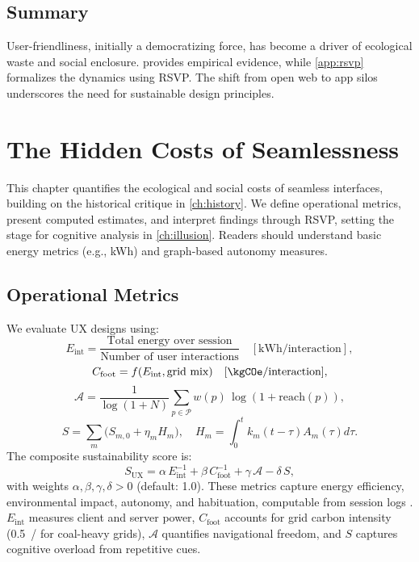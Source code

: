 \documentclass[openany]{book}
\newcommand{\Sent}{S} %
\newcommand{\Eint}{E_{\mathrm{int}}} %
\newcommand{\Cfoot}{C_{\mathrm{foot}}} %
\newcommand{\Auton}{\mathcal{A}} %
\newcommand{\SUX}{S_{\mathrm{UX}}} %
\newcommand{\kWh}{\mathrm{kWh}}
\begin{document}
\section{Summary}
User-friendliness, initially a democratizing force, has become a driver of ecological waste and social enclosure.  provides empirical evidence, while \cref{app:rsvp} formalizes the dynamics using RSVP. The shift from open web to app silos underscores the need for sustainable design principles.

\chapter{The Hidden Costs of Seamlessness}
\label{ch:hidden-costs}

This chapter quantifies the ecological and social costs of seamless interfaces, building on the historical critique in \cref{ch:history}. We define operational metrics, present computed estimates, and interpret findings through RSVP, setting the stage for cognitive analysis in \cref{ch:illusion}. Readers should understand basic energy metrics (e.g., kWh) and graph-based autonomy measures.

\section{Operational Metrics}
\label{sec:metrics-def}
We evaluate UX designs using:
\begin{equation}
\Eint = \frac{\text{Total energy over session}}{\text{Number of user interactions}} \quad [\kWh/\text{interaction}],
\end{equation}
\begin{equation}
\Cfoot = f(\Eint, \text{grid mix}) \quad [\kgCOe/\text{interaction}],
\end{equation}
\begin{equation}
\label{eq:autonomy}
\Auton = \frac{1}{\log(1+N)}\sum_{p\in \mathcal{P}} w(p)\,\log(1+\mathrm{reach}(p)),
\end{equation}
\begin{equation}
\Sent = \sum_m \big(S_{m,0} + \eta_m H_m\big), \quad H_m = \int_0^t k_m(t-\tau) A_m(\tau) d\tau.
\end{equation}
The composite sustainability score is:
\begin{equation}
\label{eq:SUX}
\SUX = \alpha\,\Eint^{-1} + \beta\,\Cfoot^{-1} + \gamma\,\Auton - \delta\,\Sent,
\end{equation}
with weights \(\alpha, \beta, \gamma, \delta > 0\) (default: 1.0). These metrics capture energy efficiency, environmental impact, autonomy, and habituation, computable from session logs \citep{extentia2024}. \(\Eint\) measures client and server power, \(\Cfoot\) accounts for grid carbon intensity (\SI{0.5}{\kgCOe/\kWh} for coal-heavy grids), \(\Auton\) quantifies navigational freedom, and \(\Sent\) captures cognitive overload from repetitive cues.
\end{document}
